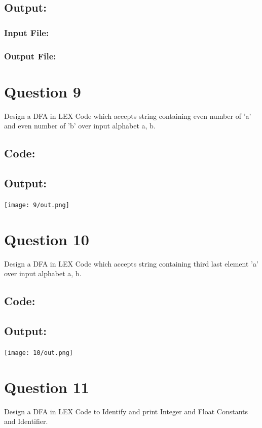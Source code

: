 \documentclass{article}
\begin{document}
\subsection*{Output:}
\subsubsection*{Input File:}

\subsubsection*{Output File:}


\newpage
\section*{Question 9}
Design a DFA in LEX Code which accepts string containing even 
number of 'a' and even number of 'b' over input alphabet {a, b}.
\subsection*{Code:}

\newpage
\subsection*{Output:}
\begin{center}
  \texttt{[image: 9/out.png]}
\end{center}

\newpage
\section*{Question 10}
Design a DFA in LEX Code which accepts string containing third 
last element 'a' over input alphabet {a, b}.
\subsection*{Code:}

\newpage
\subsection*{Output:}
\begin{center}
  \texttt{[image: 10/out.png]}
\end{center}

\newpage
\section*{Question 11}
Design a DFA in LEX Code to Identify and print Integer and Float Constants and Identifier.
\end{document}
